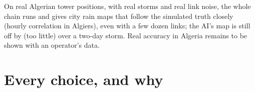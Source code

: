 \begin{oneline}
On real Algerian tower positions, with real storms and real link noise, the whole chain runs and gives city rain maps
that follow the simulated truth closely (hourly correlation \PfourAlgAIMapR{} in Algiers), even with a few dozen links; the AI's
map is still off by \PfourAlgAIMapBias{} (too little) over a two-day storm. Real accuracy in Algeria remains to be shown with an
operator's data.
\end{oneline}

\section{Every choice, and why}
\label{sec:p4_choices}

